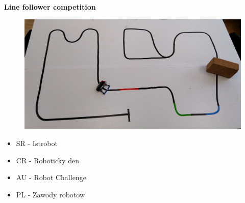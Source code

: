 \documentclass[xcolor=dvipsnames]{beamer}
\begin{document}
\begin{frame}{\bf Line follower competition}


\begin{figure}
    \includegraphics[scale=0.07]{../../pictures/motoko_uprising/line_follower.jpg}
\end{figure}

\begin{itemize}
    \item SR - Istrobot
    \item CR - Roboticky den
    \item AU - Robot Challenge
    \item PL - Zawody robotow
\end{itemize}


\end{frame}
\end{document}
